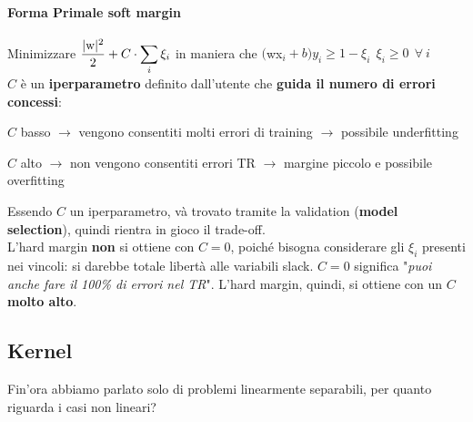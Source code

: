 \documentclass[10pt]{book}
\begin{document}
\paragraph{Forma Primale soft margin} Minimizzare $\mathlarger{\frac{|\text{w}|^2}{2} + C\cdot\sum_i \xi_i}$ in maniera che $($wx$_i + b)y_i \geq 1 - \xi_i\:\:\xi_i \geq 0\:\:\forall\:i$\\
$C$ è un \textbf{iperparametro} definito dall'utente che \textbf{guida il numero di errori concessi}:
\begin{list}{}{}
	\item $C$ basso $\rightarrow$ vengono consentiti molti errori di training $\rightarrow$ possibile underfitting
	\item $C$ alto $\rightarrow$ non vengono consentiti errori TR $\rightarrow$ margine piccolo e possibile overfitting %
\end{list}
Essendo $C$ un iperparametro, và trovato tramite la validation (\textbf{model selection}), quindi rientra in gioco il trade-off.\\
L'hard margin \textbf{non} si ottiene con $C=0$, poiché bisogna considerare gli $\xi_i$ presenti nei vincoli: si darebbe totale libertà alle variabili slack. $C = 0$ significa "\textit{puoi anche fare il 100\% di errori nel TR}". L'hard margin, quindi, si ottiene con un $C$ \textbf{molto alto}.
\subsection{Kernel}
Fin'ora abbiamo parlato solo di problemi linearmente separabili, per quanto riguarda i casi non lineari?
\end{document}
